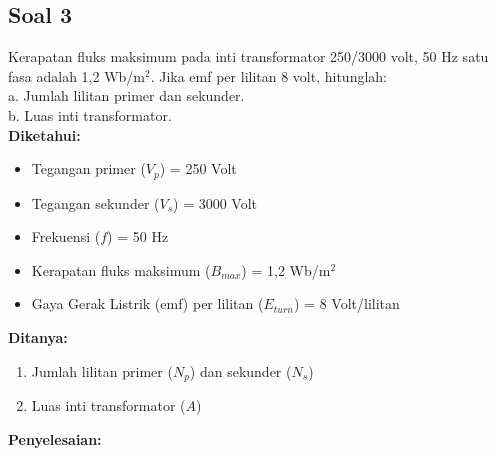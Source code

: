 \documentclass[12pt, a4paper]{article}
\begin{document}
\subsection*{Soal 3}
Kerapatan fluks maksimum pada inti transformator 250/3000 volt, 50 Hz satu fasa adalah 1,2 Wb/m$^2$. Jika emf per lilitan 8 volt, hitunglah:\\
a. Jumlah lilitan primer dan sekunder.\\
b. Luas inti transformator.\\

\textbf{Diketahui:}
\begin{itemize}
    \item Tegangan primer ($V_p$) = 250 Volt
    \item Tegangan sekunder ($V_s$) = 3000 Volt
    \item Frekuensi ($f$) = 50 Hz
    \item Kerapatan fluks maksimum ($B_{max}$) = 1,2 Wb/m$^2$
    \item Gaya Gerak Listrik (emf) per lilitan ($E_{turn}$) = 8 Volt/lilitan
\end{itemize}

\textbf{Ditanya:}
\begin{enumerate}[label=\alph*.]
    \item Jumlah lilitan primer ($N_p$) dan sekunder ($N_s$)
    \item Luas inti transformator ($A$)
\end{enumerate}

\textbf{Penyelesaian:}
\end{document}
